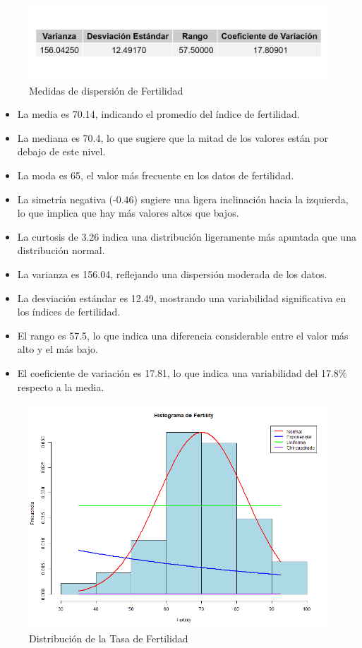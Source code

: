 \documentclass{article}
\begin{document}
\begin{figure}[h!]
 \centering
 \includegraphics[width=\textwidth]{Swiss/Fertility_dispersion.png}
 \caption{Medidas de dispersión de Fertilidad}
\end{figure}

   \begin{itemize}
       \item La media es 70.14, indicando el promedio del índice de fertilidad.
       \item La mediana es 70.4, lo que sugiere que la mitad de los valores están por debajo de este nivel.
       \item La moda es 65, el valor más frecuente en los datos de fertilidad.
       \item La simetría negativa (-0.46) sugiere una ligera inclinación hacia la izquierda, lo que implica que hay más valores altos que bajos.
       \item La curtosis de 3.26 indica una distribución ligeramente más apuntada que una distribución normal.
       \item La varianza es 156.04, reflejando una dispersión moderada de los datos.
       \item La desviación estándar es 12.49, mostrando una variabilidad significativa en los índices de fertilidad.
       \item El rango es 57.5, lo que indica una diferencia considerable entre el valor más alto y el más bajo.
       \item El coeficiente de variación es 17.81, lo que indica una variabilidad del 17.8\% respecto a la media.
   \end{itemize}

   \begin{figure}[h!]
    \centering
    \includegraphics[width=\textwidth]{Histogramas/histogram_fertility.png}
    \caption{Distribución de la Tasa de Fertilidad}
    \end{figure}
\end{document}
